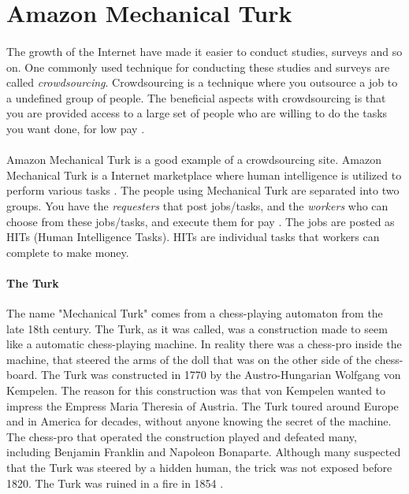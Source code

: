 \section{Amazon Mechanical Turk}\label{sec:amt}
\paragraph{}
The growth of the Internet have made it easier to conduct studies, surveys and so on. One commonly used technique for conducting these studies and surveys are called \emph{crowdsourcing}. Crowdsourcing is a technique where you outsource a job to a undefined group of people. The beneficial aspects with crowdsourcing is that you are provided access to a large set of people who are willing to do the tasks you want done, for low pay \cite{AMT}.

\paragraph{}
Amazon Mechanical Turk is a good example of a crowdsourcing site. Amazon Mechanical Turk is a Internet marketplace where human intelligence is utilized to perform various tasks \cite{amazonweb}. The people using Mechanical Turk are separated into two groups. You have the \emph{requesters} that post jobs/tasks, and the \emph{workers} who can choose from these jobs/tasks, and execute them for pay \cite{AMT}. The jobs are posted as HITs (Human Intelligence Tasks). HITs are individual tasks that workers can complete to make money. 

\paragraph{The Turk}
The name "Mechanical Turk" comes from a chess-playing automaton from the  late 18th century. The Turk, as it was called, was a construction made to seem like a automatic chess-playing machine. In reality there was a chess-pro inside the machine, that steered the arms of the doll that was on the other side of the chess-board. The Turk was constructed in 1770 by the Austro-Hungarian Wolfgang von Kempelen. The reason for this construction was that von Kempelen wanted to impress the Empress Maria Theresia of Austria. 
The Turk toured around Europe and in America for decades, without anyone knowing the secret of the machine. The chess-pro that operated the construction played and defeated many, including Benjamin Franklin and Napoleon Bonaparte. Although many suspected that the Turk was steered by a hidden human, the trick was not exposed before 1820. The Turk was ruined in a fire in 1854 \cite{theturk}.


